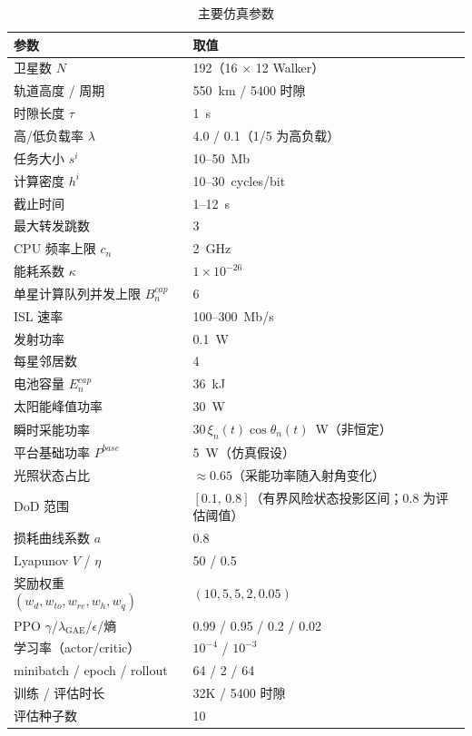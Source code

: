 \documentclass[a4paper,11pt]{article}
\begin{document}
\begin{table}[t]
\centering
\caption{主要仿真参数}
\label{tab:sim_params}
\begin{tabular}{ll}
\hline
参数 & 取值 \\
\hline
卫星数 $N$ & 192（16 $\times$ 12 Walker）\\
轨道高度 / 周期 & 550~km / 5400 时隙 \\
时隙长度 $\tau$ & 1~s \\
高/低负载率 $\lambda$ & 4.0 / 0.1（1/5 为高负载）\\
任务大小 $s^i$ & 10--50~Mb \\
计算密度 $h^i$ & 10--30~cycles/bit~\cite{zhang2024mhspo} \\
截止时间 & 1--12~s \\
最大转发跳数 & 3 \\
CPU 频率上限 $c_n$ & 2~GHz~\cite{zhang2024mhspo} \\
能耗系数 $\kappa$ & $1\times10^{-26}$~\cite{zhang2024mhspo} \\
单星计算队列并发上限 $B^{cap}_n$ & 6 \\
ISL 速率 & 100--300~Mb/s \\
发射功率 & 0.1~W \\
每星邻居数 & 4 \\
电池容量 $E^{cap}_n$ & 36~kJ \\
太阳能峰值功率 & 30~W \\
瞬时采能功率 & $30\,\xi_n(t)\cos\theta_n(t)$~W（非恒定）\\
平台基础功率 $P^{base}$ & 5~W（仿真假设）\\
光照状态占比 & $\approx 0.65$（采能功率随入射角变化）\\
DoD 范围 & $[0.1,\,0.8]$（有界风险状态投影区间；0.8 为评估阈值）\\
损耗曲线系数 $a$ & 0.8 \\
Lyapunov $V$ / $\eta$ & 50 / 0.5 \\
奖励权重 $(w_d,w_{to},w_{re},w_h,w_q)$ & $(10,5,5,2,0.05)$ \\
PPO $\gamma$/$\lambda_{\text{GAE}}$/$\epsilon$/熵 & 0.99 / 0.95 / 0.2 / 0.02 \\
学习率（actor/critic） & $10^{-4}$ / $10^{-3}$ \\
minibatch / epoch / rollout & 64 / 2 / 64 \\
训练 / 评估时长 & 32K / 5400 时隙 \\
评估种子数 & 10 \\
\hline
\end{tabular}
\end{table}
\end{document}
